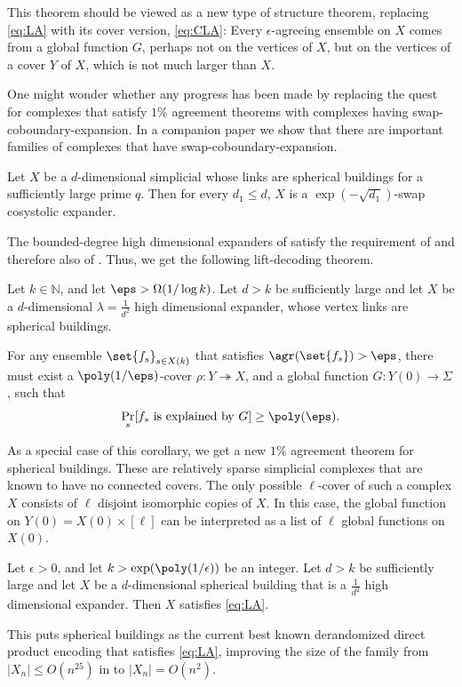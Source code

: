 \documentclass{article}[11pt]
\begin{document}
This theorem should be viewed as a new type of structure theorem, replacing \eqref{eq:LA} with its cover version, \eqref{eq:CLA}: Every $\epsilon$-agreeing ensemble on $X$ comes from a global function $G$, perhaps not on the vertices of $X$, but on the vertices of a cover $Y$ of $X$, which is not much larger than $X$.

One might wonder whether any progress has been made by replacing the quest for complexes that satisfy $1\%$ agreement theorems with complexes having swap-coboundary-expansion. In a companion paper \cite{DiksteinD2023b}
we show that there are important families of complexes that have swap-coboundary-expansion.

\begin{theorem}\label{thm:DD-faces}
    Let $X$ be a \(d\)-dimensional simplicial whose links are spherical buildings for a sufficiently large prime \(q\). Then for every \(d_1 \leq d\), \(X\) is a \(\exp(-\sqrt{d_1})\)-swap cosystolic expander. 
\end{theorem}

The bounded-degree high dimensional expanders of \cite{LubotzkySV2005a, LubotzkySV2005b} satisfy the requirement of  and therefore also of . Thus, we get the following lift-decoding theorem.

\begin{corollary}\label{cor:general} Let $k\in \mathbb{N}$, and let $\eps >\Omega( 1/\log k)$. Let $d>k$ be sufficiently large and let $X$ be a $d$-dimensional $\lambda=\frac{1}{d^2}$ high dimensional expander, whose vertex links are spherical buildings.

For any ensemble $\set{f_s}_{s\in X(k)}$ that satisfies 
   $\agr(\set{f_s})> \eps$, there must exist a $\poly(1/\eps)$-cover $\rho:Y\twoheadrightarrow X$, and a global function $G:Y(0)\to\Sigma$, such that 
   \[\Pr_{s}[f_s\hbox{ is explained by }G]\geq\poly(\eps).\]
\end{corollary}
As a special case of this corollary, we get a new $1\%$ agreement theorem for spherical buildings. These are relatively sparse simplicial complexes that are known to have no connected covers. The only possible $\ell$-cover of such a complex $X$ consists of $\ell$ disjoint isomorphic copies of $X$. In this case, the global function on $Y(0) = X(0)\times [\ell]$ can be interpreted as a list of $\ell$ global functions on $X(0)$.
%
\begin{corollary}\label{cor:spherical-building-list-agreement}
    Let $\epsilon>0$, and let $k>\exp(\poly(1/\epsilon))$ be an integer. Let $d>k$ be sufficiently large and let $X$ be a $d$-dimensional spherical building that is a $\frac{1}{d^2}$ high dimensional expander. Then $X$ satisfies \eqref{eq:LA}.
\end{corollary}
This puts spherical buildings as the current best known derandomized direct product encoding that satisfies \eqref{eq:LA}, improving the size of the family from $|X_n| \leq O(n^{25})$ in \cite{ImpagliazzoKW2012} to $|X_n| = O(n^2)$.
\end{document}
